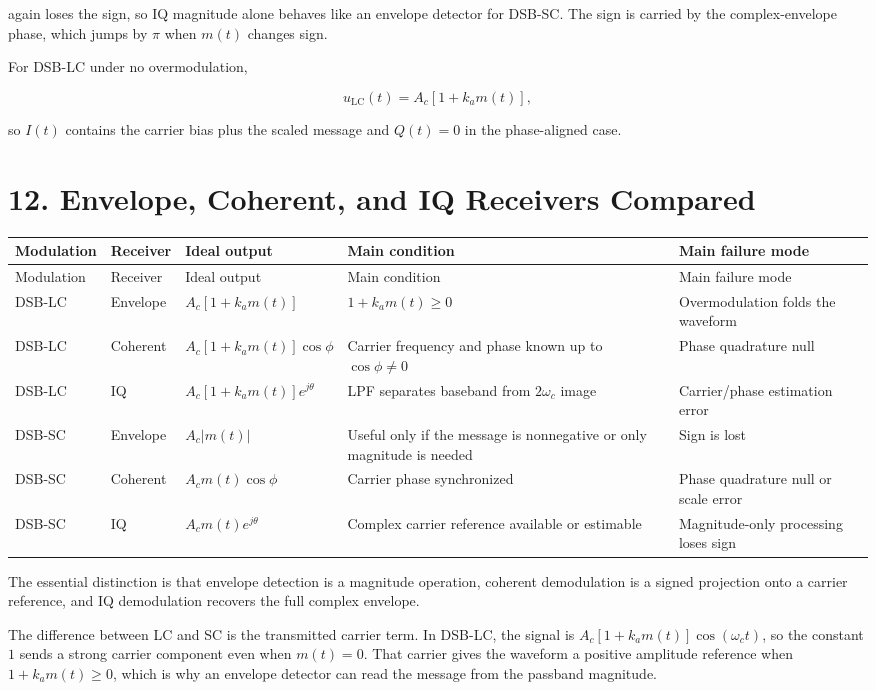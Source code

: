 \documentclass[11pt]{article}
\begin{document}
again loses the sign, so IQ magnitude alone behaves like an envelope detector for DSB-SC. The sign is carried by the complex-envelope phase, which jumps by $\pi$ when $m(t)$ changes sign.

For DSB-LC under no overmodulation,

\[
u_{\mathrm{LC}}(t)=A_c\left[1+k_a m(t)\right],
\]

so $I(t)$ contains the carrier bias plus the scaled message and $Q(t)=0$ in the phase-aligned case.

\section{12. Envelope, Coherent, and IQ Receivers Compared}

\begin{longtable}{|p{}|p{}|p{}|p{}|p{}|}
\hline
Modulation & Receiver & Ideal output & Main condition & Main failure mode \\
\hline
\endfirsthead
\hline
Modulation & Receiver & Ideal output & Main condition & Main failure mode \\
\hline
\endhead
DSB-LC & Envelope & $A_c[1+k_a m(t)]$ & $1+k_a m(t)\geq 0$ & Overmodulation folds the waveform \\
\hline
DSB-LC & Coherent & $A_c[1+k_a m(t)]\cos\phi$ & Carrier frequency and phase known up to $\cos\phi\neq 0$ & Phase quadrature null \\
\hline
DSB-LC & IQ & $A_c[1+k_a m(t)]e^{j\theta}$ & LPF separates baseband from $2\omega_c$ image & Carrier/phase estimation error \\
\hline
DSB-SC & Envelope & $A_c\lvert m(t)\rvert$ & Useful only if the message is nonnegative or only magnitude is needed & Sign is lost \\
\hline
DSB-SC & Coherent & $A_c m(t)\cos\phi$ & Carrier phase synchronized & Phase quadrature null or scale error \\
\hline
DSB-SC & IQ & $A_c m(t)e^{j\theta}$ & Complex carrier reference available or estimable & Magnitude-only processing loses sign \\
\hline
\end{longtable}

The essential distinction is that envelope detection is a magnitude operation, coherent demodulation is a signed projection onto a carrier reference, and IQ demodulation recovers the full complex envelope.

The difference between LC and SC is the transmitted carrier term. In DSB-LC, the signal is $A_c[1+k_a m(t)]\cos(\omega_c t)$, so the constant $1$ sends a strong carrier component even when $m(t)=0$. That carrier gives the waveform a positive amplitude reference when $1+k_a m(t)\geq 0$, which is why an envelope detector can read the message from the passband magnitude.
\end{document}
